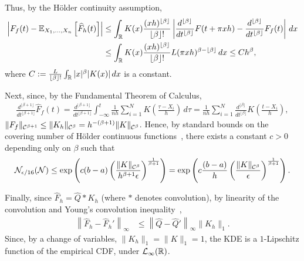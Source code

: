 \documentclass{article}
\begin{document}
Thus, by the H\"older continuity assumption,
\begin{align}
    \notag
    \left| F_f(t) - \operatorname{\mathbb{E}}_{X_1,...,X_n} \left[ \widehat F_h(t) \right] \right|
    & \leq \int_{\mathbb{R}} K(x) \frac{(xh)^{\lfloor \beta \rfloor}}{\lfloor \beta \rfloor!} \left| \frac{d^{\lfloor \beta \rfloor}}{dt^{\lfloor \beta \rfloor}} F(t + \pi xh) - \frac{d^{\lfloor \beta \rfloor}}{dt^{\lfloor \beta \rfloor}} F_f(t) \right| \, dx \\
    \label{ineq:KDE_bias_bound}
    & \leq \int_{\mathbb{R}} K(x) \frac{(xh)^{\lfloor \beta \rfloor}}{\lfloor \beta \rfloor!} L (\pi xh)^{\beta - \lfloor \beta \rfloor} \, dx
    \leq C h^\beta,
\end{align}
where $C := \frac{L}{\lfloor \beta \rfloor!} \int_{\mathbb{R}} |x|^\beta |K(x)| \, dx$ is a constant.

Next, since, by the Fundamental Theorem of Calculus,
\begin{align*}
    \frac{d^{\lfloor \beta+1 \rfloor}}{dt^{\lfloor \beta+1 \rfloor}} \widehat F_f(t)
      = \frac{d^{\lfloor \beta+1 \rfloor}}{dt^{\lfloor \beta+1 \rfloor}} \int_{-\infty}^t \frac{1}{nh} \sum_{i = 1}^N K \left( \frac{\tau - X_i}{h} \right) \, d\tau
      = \frac{1}{nh} \sum_{i = 1}^N \frac{d^{\lfloor \beta \rfloor}}{dt^{\lfloor \beta \rfloor}} K \left( \frac{t - X_i}{h} \right),
\end{align*}
$\|F_f\|_{\mathcal{C}^{\beta+1}} \leq \|K_h\|_{\mathcal{C}^\beta} = h^{-(\beta+1)} \|K\|_{\mathcal{C}^\beta}$.
Hence, by standard bounds on the covering number of H\"older continuous functions~\citep{devore1993constructive}, there exists a constant $c > 0$ depending only on $\beta$ such that
\begin{equation}
    \mathcal{N}_{\epsilon/16}(\mathcal{N})
      \leq \exp \left( c (b - a) \left( \frac{\|K\|_{\mathcal{C}^\beta}}{h^{\beta+1} \epsilon} \right)^{\frac{1}{\beta+1}} \right)
      = \exp \left( c \frac{(b - a)}{h} \left( \frac{\|K\|_{\mathcal{C}^\beta}}{\epsilon} \right)^{\frac{1}{\beta+1}} \right).
    \label{ineq:KDE_covering_number_bound}
\end{equation}

Finally, since $\widehat F_h = \widehat Q * K_h$ (where $*$ denotes convolution), by linearity of the convolution and Young's convolution inequality~\citep[p.34]{ball1997elementary},
\begin{align*}
    \left\| \widehat F_h - \widehat F_h' \right\|_\infty
    & \leq \left\| \widehat Q - \widehat Q' \right\|_\infty \|K_h\|_1.
\end{align*}
Since, by a change of variables, $\|K_h\|_1 = \|K\|_1 = 1$, the KDE is a $1$-Lipschitz function of the empirical CDF, under $\mathcal{L}_\infty(\mathbb{R})$.
\end{document}
